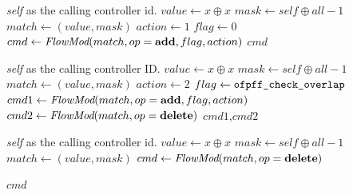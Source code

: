 \documentclass[conference]{sigcomm-alternate}
\newcommand{\concat}[0]{\oplus}
\newcommand{\claimcheck}{check\xspace}
\newcommand{\add}{\textbf{add}\xspace}
\newcommand{\dele}{\textbf{delete}\xspace}
\newcommand{\checko}{\texttt{check\_overlap}\xspace}
\begin{document}

\begin{algorithm}[H]
    \caption{$\textit{claim}(x)$}
    \label{alg:claim}
    \begin{algorithmic}[1]
    \Require \emph{self} as the calling controller id.
    		\State $value \gets x\concat x$
    		\State $mask \gets self\concat all-1$
	    	\State $match \gets (value,mask)$
    		\State $action \gets 1$
    		\State $flag \gets 0$
    		\State $cmd\gets \emph{FlowMod}(match, op = \add, flag, action) $
			\Return $cmd$
    \end{algorithmic}
\end{algorithm}

\begin{algorithm}[H]
    \caption{$\textit{\claimcheck}(x)$}
    \label{alg:check}
    \begin{algorithmic}[1]
    \Require \emph{self} as the calling controller ID.
    		\State $value \gets x\concat x$
    		\State $mask \gets self\concat all-1$
    		\State $match \gets (value,mask)$
    		\State $action \gets 2$
    		\State $flag \gets \texttt{ofpff\_\checko}$
    		\State $cmd1\gets \emph{FlowMod}(match, op = \add, flag, action) $
    		\State $cmd2\gets \emph{FlowMod}(match, op = \dele) $
			\Return $cmd1$,$cmd2$
    \end{algorithmic}
\end{algorithm}

\begin{algorithm}[H]
    \caption{$\textit{unclaim}(x)$}
    \label{alg:unclaim}
    \begin{algorithmic}[1]
    \Require \emph{self} as the calling controller id.
    		\State $value \gets x\concat x$
    		\State $mask \gets self\concat all-1$
    		\State $match \gets (value,mask)$
    		\State $cmd\gets \emph{FlowMod}(match, op=\dele) $
    	
			
			\Return $cmd$
    \end{algorithmic}
\end{algorithm}
\end{document}
